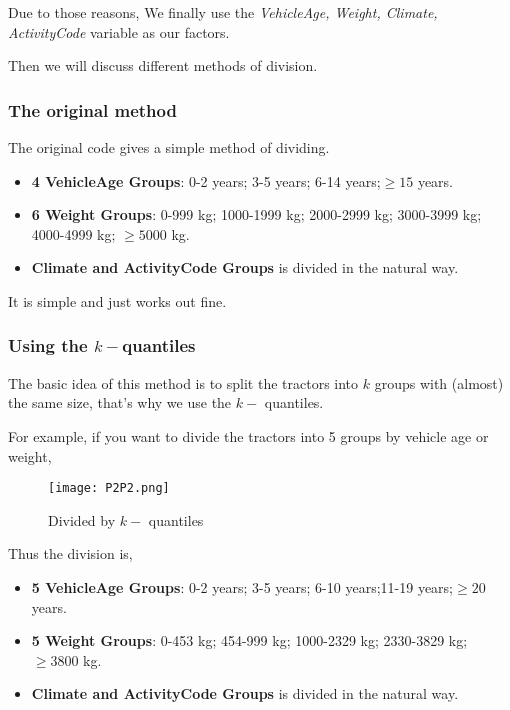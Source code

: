 \documentclass[11pt]{article}
\begin{document}
Due to those reasons, We finally use the {\it VehicleAge, Weight, Climate, ActivityCode} variable as our factors.\newline

Then we will discuss different methods of division.


\subsubsection{The original method}\label{ch1}

The original code gives a simple method of dividing.

\begin{itemize}
	\item {\bf 4 VehicleAge Groups}: 0-2 years; 3-5 years; 6-14 years;$\geqslant 15$ years.
	\item {\bf 6 Weight Groups}: 0-999 kg; 1000-1999 kg; 2000-2999 kg; 3000-3999 kg; 4000-4999 kg; $\geqslant5000$ kg.
	\item {\bf Climate and ActivityCode Groups} is divided in the natural way. 
\end{itemize}

It is simple and just works out fine.

\subsubsection{Using the \texorpdfstring{$k-$} qquantiles}

The basic idea of this method is to split the tractors into $k$ groups with (almost) the same size, that's why we use the {$k-$} quantiles.

For example, if you want to divide the tractors into 5 groups by vehicle age or weight,

\begin{figure}[!htb]
\centering
\texttt{[image: P2P2.png]}
\caption{Divided by $k-$ quantiles}\label{Fig2}
\end{figure}

Thus the division is,

\begin{itemize}
	\item {\bf 5 VehicleAge Groups}: 0-2 years; 3-5 years; 6-10 years;11-19 years;$\geqslant 20$ years.
	\item {\bf 5 Weight Groups}: 0-453 kg; 454-999 kg; 1000-2329 kg; 2330-3829 kg;  $\geqslant3800$ kg.
	\item {\bf Climate and ActivityCode Groups} is divided in the natural way. 
\end{itemize}
\end{document}
